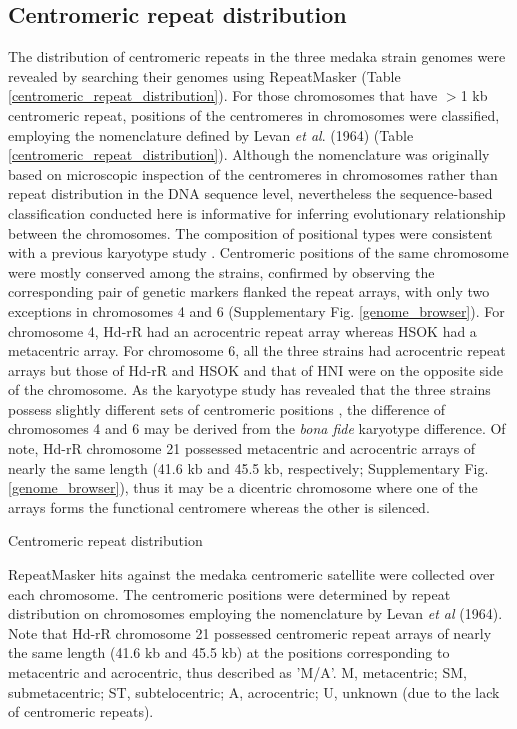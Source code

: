 \subsection*{Centromeric repeat distribution}
  The distribution of centromeric repeats in the three medaka strain genomes were revealed by searching their genomes using RepeatMasker (Table \ref{centromeric_repeat_distribution}). For those chromosomes that have $>$1 kb centromeric repeat, positions of the centromeres in chromosomes were classified, employing the nomenclature defined by Levan \textit{et al}. (1964) (Table \ref{centromeric_repeat_distribution}). Although the nomenclature was originally based on microscopic inspection of the centromeres in chromosomes rather than repeat distribution in the DNA sequence level, nevertheless the sequence-based classification conducted here is informative for inferring evolutionary relationship between the chromosomes. The composition of positional types were consistent with a previous karyotype study \cite{}. Centromeric positions of the same chromosome were mostly conserved among the strains, confirmed by observing the corresponding pair of genetic markers flanked the repeat arrays, with only two exceptions in chromosomes 4 and 6 (Supplementary Fig. \ref{genome_browser}). For chromosome 4, Hd-rR had an acrocentric repeat array whereas HSOK had a metacentric array. For chromosome 6, all the three strains had acrocentric repeat arrays but those of Hd-rR and HSOK and that of HNI were on the opposite side of the chromosome. As the karyotype study has revealed that the three strains possess slightly different sets of centromeric positions \cite{}, the difference of chromosomes 4 and 6 may be derived from the \textit{bona fide} karyotype difference. Of note, Hd-rR chromosome 21 possessed metacentric and acrocentric arrays of nearly the same length (41.6 kb and 45.5 kb, respectively; Supplementary Fig. \ref{genome_browser}), thus it may be a dicentric chromosome where one of the arrays forms the functional centromere whereas the other is silenced.


  \begin{table*}[htp]
    \centering
    \caption{Centromeric repeat distribution}
    
    \label{centromeric_repeat_distribution}
    \caption*{{\small
      RepeatMasker hits against the medaka centromeric satellite were collected over each chromosome. The centromeric positions were determined by repeat distribution on chromosomes employing the nomenclature by Levan \textit{et al} (1964). Note that Hd-rR chromosome 21 possessed centromeric repeat arrays of nearly the same length (41.6 kb and 45.5 kb) at the positions corresponding to metacentric and acrocentric, thus described as 'M/A'. M, metacentric; SM, submetacentric; ST, subtelocentric; A, acrocentric; U, unknown (due to the lack of centromeric repeats).
    }}
  \end{table*}


